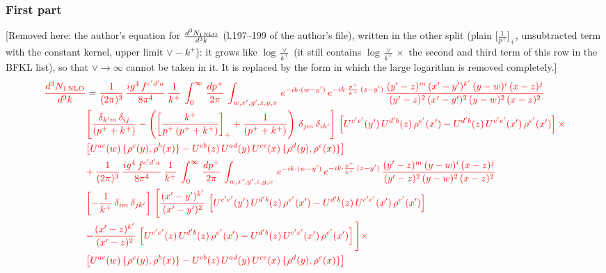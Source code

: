 \documentclass[9pt]{article}
\numberwithin{equation}{section}
\begin{document}
\subsubsection{First part}
{\color{orange}[Removed here: the author's equation for $\frac{d^{3}N_{1\,\rm NLO}}{d^{3}k}$ (l.197--199 of the author's file), written in the other split (plain $\big[\frac{1}{p^{+}}\big]_{+}$, unsubtracted term with the constant kernel, upper limit $\vee-k^{+}$): it grows like $\log\frac{\vee}{k^{+}}$ (it still contains $\log\frac{\vee}{k^{+}}\times$ the second and third term of this row in the BFKL list), so that $\vee\to\infty$ cannot be taken in it. It is replaced by the form in which the large logarithm is removed completely.]}
\begin{align}
     {\color{red}\frac{d^{3}N_{1\,\rm NLO}}{d^{3}k}} & = {\color{red}\frac{1}{(2\pi)^{3}}\, \frac{ig^{4}\,f^{c'd'a}}{8\pi^{4}}\, \frac{1}{k^{+}}\,\int_{0}^{\infty}\,  \frac{dp^{+}}{2\pi}\, \int_{w,x',y',z,y,x}\, e^{-ik\cdot (w-y')}\, e^{-ik\cdot \frac{p^{+}}{k^{+}}\,(z-y')}\,\frac{(y'-z)^{m}\,(x'-y')^{k'}\,(y-w)^{i}\,(x-z)^{j}}{(y'-z)^{2}\,(x'-y')^{2}\,(y-w)^{2}\,(x-z)^{2}}}\notag \\ & {\color{red}\left[\frac{\delta_{k'm}\,\delta_{ij}}{(p^{+}+k^{+})}-\left(\left[\frac{k^{+}}{p^{+}\,(p^{+}+k^{+})}\right]_{+}+\frac{1}{(p^{+}+k^{+})}\right)\,\delta_{jm}\,\delta_{ik'}\right]\, \left[U^{c'e'}(y')\,U^{d'b}(z)\,\rho^{e'}(x')-U^{d'b}(z)\,U^{c'e'}(x')\,\rho^{e'}(x')\right]\times}\notag \\ &  {\color{red}\left[U^{ac}(w)\, \{\rho^{c}(y),\rho^{b}(x)\}-U^{cb}(z)\,U^{ad}(y)\,U^{ce}(x)\,\{\rho^{d}(y),\rho^{e}(x)\}\right]} \notag \\
&  {\color{red}+\,\frac{1}{(2\pi)^{3}}\, \frac{ig^{4}\,f^{c'd'a}}{8\pi^{4}}\, \frac{1}{k^{+}}\,\int_{0}^{\infty}\,  \frac{dp^{+}}{2\pi}\, \int_{w,x',y',z,y,x}\, e^{-ik\cdot (w-y')}\, e^{-ik\cdot \frac{p^{+}}{k^{+}}\,(z-y')}\,\frac{(y'-z)^{m}\,(y-w)^{i}\,(x-z)^{j}}{(y'-z)^{2}\,(y-w)^{2}\,(x-z)^{2}}}\notag \\ &   {\color{red}\left[-\frac{1}{k^{+}}\, \delta_{im}\, \delta_{jk'}\right]\, \Bigg[\frac{(x'-y')^{k'}}{(x'-y')^{2}}\,\left[U^{c'e'}(y')\,U^{d'b}(z)\,\rho^{e'}(x')-U^{d'b}(z)\,U^{c'e'}(x')\,\rho^{e'}(x')\right]}\notag \\ & {\color{red}-\frac{(x'-z)^{k'}}{(x'-z)^{2}}\,\left[U^{c'e'}(z)\,U^{d'b}(z)\,\rho^{e'}(x')-U^{d'b}(z)\,U^{c'e'}(x')\,\rho^{e'}(x')\right]\Bigg]\times}\notag \\ &   {\color{red}\left[U^{ac}(w)\, \{\rho^{c}(y),\rho^{b}(x)\}-U^{cb}(z)\,U^{ad}(y)\,U^{ce}(x)\,\{\rho^{d}(y),\rho^{e}(x)\}\right]}
\end{align}
\end{document}
